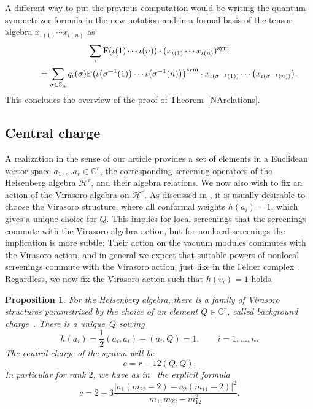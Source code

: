 \documentclass[pdftex]{sigma}%
\numberwithin{equation}{section}
\newtheorem{prop}[teo]{Proposition}
\newcommand{\C}{\mathbb{C}}
\renewcommand{\S}{\mathbb{S}}
\newcommand{\Fp}{\mathrm{F}}
\begin{document}
A different way to put the previous computation would be writing the quantum symmetrizer formula in the new notation and in a formal basis of the tensor algebra $x_{\iota(1)}\cdots x_{\iota(n)}$ as
\begin{gather*}
\sum_\iota  \Fp(\iota(1)\cdots\iota(n))\cdot (x_{\iota(1)} \cdots x_{\iota(n)})^{{\rm sym}}\\
\qquad {} = \sum_{\sigma\in\S_n} q_\iota(\sigma)
\Fp\big(\iota\big(\sigma^{-1}(1)\big)\cdots\iota\big(\sigma^{-1}(n)\big)\big)^{{\rm sym}}
\cdot x_{\iota(\sigma^{-1}(1))} \cdots \big(x_{\iota(\sigma^{-1}(n))}\big).
\end{gather*}
This concludes the overview of the proof of Theorem~\ref{NArelations}.

\subsection{Central charge}
A realization in the sense of our article provides a set of elements in a Euclidean vector space $a_1,\dots a_r\in \C^r$, the corresponding screening operators of the Heisenberg algebra $\mathcal{H}^r$, and their algebra relations. We now also wish to fix an action of the Virasoro algebra on $\mathcal{H}^r$. As discussed in \cite{FL17}, it is usually desirable to choose the Virasoro structure, where all conformal weights $h(a_i)=1$, which gives a unique choice for $Q$. This implies for local screenings that the screenings commute with the Virasoro algebra action, but for nonlocal screenings the implication is more subtle: Their action on the vacuum modules commutes with the Virasoro action, and in general we expect that suitable powers of nonlocal screenings commute with the Virasoro action, just like in the Felder complex \cite{Fel89}. Regardless, we now fix the Virasoro action such that $h(v_i)=1$ holds.

\begin{prop}\label{central_charge} For the Heisenberg algebra, there is a family of Virasoro structures pa\-ra\-met\-ri\-zed by the choice of an element $Q\in \C^r$, called background charge~{\rm \cite{FF84}}. There is a uni\-que~$Q$ solving
	\begin{equation*}%
	h(a_i)=\frac{1}{2}(a_i,a_i) -(a_i,Q)=1, \qquad i=1, \dots, n.
	\end{equation*}
	The central charge of the system will be \[c = r - 12(Q, Q).\]
	In particular for rank $2$, we have as in~{\rm \cite{Sem14}} the explicit formula
	\begin{equation}\label{centralcharge}
	c = 2-3\frac{|a_1(m_{22}-2)-a_2(m_{11}-2)|^2}{m_{11}m_{22}-m_{12}^2}.
	\end{equation}
\end{prop}
\end{document}
